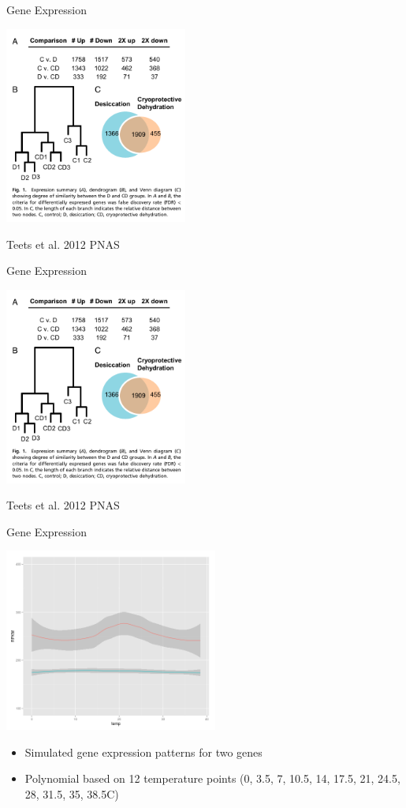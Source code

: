 \documentclass{beamer}
\begin{document}
\begin{frame}{Gene Expression}
	\begin{center}
		\includegraphics[width=6cm]{Teets2012_Fig1_genex.png}
	\end{center}

	\tiny{Teets et al. 2012 PNAS }
\end{frame}


\begin{frame}{Gene Expression}
	\begin{center}
		\includegraphics[width=6cm]{Teets2012_Fig1_genex.png}
	\end{center}

	\tiny{Teets et al. 2012 PNAS }
\end{frame}


\begin{frame}{Gene Expression}
	\begin{center}
		\includegraphics[width=7cm,keepaspectratio]{sim_GenEx_sub.png}
	\end{center}
	\begin{itemize}
		\item Simulated gene expression patterns for two genes
		\item Polynomial based on 12 temperature points (0, 3.5, 7, 10.5, 14, 17.5, 21, 24.5, 28, 31.5, 35, 38.5\degree C)
	\end{itemize}
\end{frame}
\end{document}
